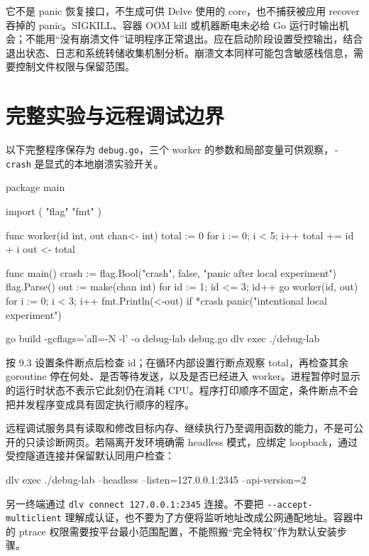 \documentclass[UTF8,fontset=fandol,openany,11pt]{ctexbook}
\begin{document}
它不是 panic 恢复接口，不生成可供 Delve 使用的 core，也不捕获被应用 recover 吞掉的 panic。SIGKILL、容器 OOM kill 或机器断电未必给 Go 运行时输出机会；不能用“没有崩溃文件”证明程序正常退出。应在启动阶段设置受控输出，结合退出状态、日志和系统转储收集机制分析。崩溃文本同样可能包含敏感栈信息，需要控制文件权限与保留范围。

\section{完整实验与远程调试边界}
以下完整程序保存为 \texttt{debug.\allowbreak{}go}，三个 worker 的参数和局部变量可供观察，\texttt{-\allowbreak{}crash} 是显式的本地崩溃实验开关。

\begin{codeblock}
package main

import (
	"flag"
	"fmt"
)

func worker(id int, out chan<- int) {
	total := 0
	for i := 0; i < 5; i++ {
		total += id + i
	}
	out <- total
}

func main() {
	crash := flag.Bool("crash", false, "panic after local experiment")
	flag.Parse()
	out := make(chan int)
	for id := 1; id <= 3; id++ {
		go worker(id, out)
	}
	for i := 0; i < 3; i++ {
		fmt.Println(<-out)
	}
	if *crash {
		panic("intentional local experiment")
	}
}
\end{codeblock}

\begin{codeblock}
go build -gcflags='all=-N -l' -o debug-lab debug.go
dlv exec ./debug-lab
\end{codeblock}

按 9.3 设置条件断点后检查 id；在循环内部设置行断点观察 total，再检查其余 goroutine 停在何处、是否等待发送，以及是否已经进入 worker。进程暂停时显示的运行时状态不表示它此刻仍在消耗 CPU。程序打印顺序不固定，条件断点不会把并发程序变成具有固定执行顺序的程序。

远程调试服务具有读取和修改目标内存、继续执行乃至调用函数的能力，不是可公开的只读诊断网页。若隔离开发环境确需 headless 模式，应绑定 loopback，通过受控隧道连接并保留默认同用户检查：

\begin{codeblock}
dlv exec ./debug-lab --headless --listen=127.0.0.1:2345 --api-version=2
\end{codeblock}

另一终端通过 \texttt{dlv connect 127.\allowbreak{}0.\allowbreak{}0.\allowbreak{}1:\allowbreak{}2345} 连接。不要把 \texttt{-\allowbreak{}-\allowbreak{}accept-\allowbreak{}multiclient} 理解成认证，也不要为了方便将监听地址改成公网通配地址。容器中的 ptrace 权限需要按平台最小范围配置，不能照搬“完全特权”作为默认安装步骤。\cite{tools-delve-exec}
\end{document}
